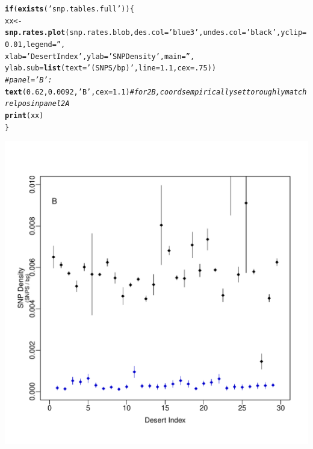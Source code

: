\documentclass{article}\usepackage[]{graphicx}\usepackage[]{color}
\makeatletter
\def\maxwidth{ %
  \ifdim\Gin@nat@width>\linewidth
    \linewidth
  \else
    \Gin@nat@width
  \fi
}
\newcommand{\hlnum}[1]{\textcolor[rgb]{0.686,0.059,0.569}{#1}}%
\newcommand{\hlstr}[1]{\textcolor[rgb]{0.192,0.494,0.8}{#1}}%
\newcommand{\hlcom}[1]{\textcolor[rgb]{0.678,0.584,0.686}{\textit{#1}}}%
\newcommand{\hlstd}[1]{\textcolor[rgb]{0.345,0.345,0.345}{#1}}%
\newcommand{\hlkwa}[1]{\textcolor[rgb]{0.161,0.373,0.58}{\textbf{#1}}}%
\newcommand{\hlkwb}[1]{\textcolor[rgb]{0.69,0.353,0.396}{#1}}%
\newcommand{\hlkwc}[1]{\textcolor[rgb]{0.333,0.667,0.333}{#1}}%
\newcommand{\hlkwd}[1]{\textcolor[rgb]{0.737,0.353,0.396}{\textbf{#1}}}%
\newenvironment{kframe}{%
 \def\at@end@of@kframe{}%
 \ifinner\ifhmode%
  \def\at@end@of@kframe{\end{minipage}}%
  \begin{minipage}{\columnwidth}%
 \fi\fi%
 \def\FrameCommand##1{\hskip\@totalleftmargin \hskip-\fboxsep
 \colorbox{shadecolor}{##1}\hskip-\fboxsep
     \hskip-\linewidth \hskip-\@totalleftmargin \hskip\columnwidth}%
 \MakeFramed {\advance\hsize-\width
   \@totalleftmargin\z@ \linewidth\hsize
   \@setminipage}}%
 {\par\unskip\endMakeFramed%
 \at@end@of@kframe}
\newenvironment{knitrout}{}{} %
\makeatother
\begin{document}
\begin{knitrout}\footnotesize
{}\color{fgcolor}\begin{kframe}
\begin{alltt}
\hlkwa{if}\hlstd{(}\hlkwd{exists}\hlstd{(}\hlstr{'snp.tables.full'}\hlstd{))\{}
  \hlstd{xx} \hlkwb{<-} \hlkwd{snp.rates.plot}\hlstd{(snp.rates.blob,} \hlkwc{des.col}\hlstd{=}\hlstr{'blue3'}\hlstd{,} \hlkwc{undes.col}\hlstd{=}\hlstr{'black'}\hlstd{,} \hlkwc{yclip}\hlstd{=}\hlnum{0.01}\hlstd{,} \hlkwc{legend}\hlstd{=}\hlstr{''}\hlstd{,}
                       \hlkwc{xlab}\hlstd{=}\hlstr{'Desert Index'}\hlstd{,} \hlkwc{ylab}\hlstd{=}\hlstr{'SNP Density'}\hlstd{,} \hlkwc{main}\hlstd{=}\hlstr{''}\hlstd{,}
                       \hlkwc{ylab.sub}\hlstd{=}\hlkwd{list}\hlstd{(}\hlkwc{text}\hlstd{=}\hlstr{'(SNPS / bp)'}\hlstd{,} \hlkwc{line}\hlstd{=}\hlnum{1.1}\hlstd{,} \hlkwc{cex}\hlstd{=}\hlnum{.75}\hlstd{))}
  \hlcom{# panel='B':}
  \hlkwd{text}\hlstd{(}\hlnum{0.62}\hlstd{,}\hlnum{0.0092}\hlstd{,}\hlstr{'B'}\hlstd{,}\hlkwc{cex}\hlstd{=}\hlnum{1.1}\hlstd{)} \hlcom{# for 2B, coords empirically set to roughly match rel pos in panel 2A}
  \hlkwd{print}\hlstd{(xx)}
\hlstd{\}}
\end{alltt}
\end{kframe}
\includegraphics[width=\maxwidth]{figs-knitr/unnamed-chunk-9-1} 

\end{knitrout}
\end{document}
